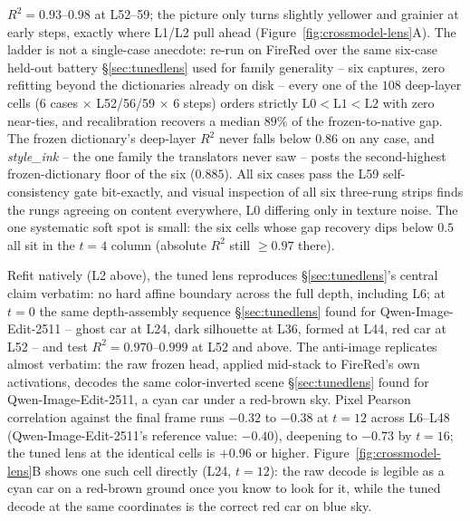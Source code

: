\documentclass[10pt,twocolumn]{article}
\newcommand{\model}{Qwen-Image-Edit-2511}
\begin{document}
$R^2 = 0.93$--$0.98$ at L52--59; the picture only turns slightly
yellower and grainier at early steps, exactly where L1/L2 pull ahead
(Figure~\ref{fig:crossmodel-lens}A). The ladder is not a single-case
anecdote: re-run on FireRed over the same six-case held-out battery
\S\ref{sec:tunedlens} used for family generality -- six captures,
zero refitting beyond the dictionaries already on disk -- every one
of the $108$ deep-layer cells ($6$ cases $\times$ L52/56/59
$\times$ $6$ steps) orders strictly
$\text{L0}<\text{L1}<\text{L2}$ with zero near-ties, and recalibration
recovers a median $89\%$ of the frozen-to-native gap. The frozen
dictionary's deep-layer $R^2$ never falls below $0.86$ on any case,
and \emph{style\_ink} -- the one family the translators never saw --
posts the second-highest frozen-dictionary floor of the six
($0.885$). All six cases pass the L59 self-consistency gate
bit-exactly, and visual inspection of all six three-rung strips
finds the rungs agreeing on content everywhere, L0 differing only in
texture noise. The one systematic soft spot is small: the six cells
whose gap recovery dips below $0.5$ all sit in the $t{=}4$ column
(absolute $R^2$ still ${\ge}0.97$ there).

Refit natively (L2 above), the tuned lens reproduces
\S\ref{sec:tunedlens}'s central claim verbatim: no hard affine
boundary across the full depth, including L6; at $t{=}0$ the same
depth-assembly sequence \S\ref{sec:tunedlens} found for \model{} --
ghost car at L24, dark silhouette at L36, formed at L44, red car at
L52 -- and test $R^2 = 0.970$--$0.999$ at L52 and above. The anti-image
replicates almost verbatim: the raw frozen head, applied mid-stack to
FireRed's own activations, decodes the same color-inverted scene
\S\ref{sec:tunedlens} found for \model{}, a cyan car under a
red-brown sky. Pixel Pearson correlation against the final frame runs
$-0.32$ to $-0.38$ at $t{=}12$ across L6--L48 (\model{}'s reference
value: $-0.40$), deepening to $-0.73$ by $t{=}16$; the tuned lens at
the identical cells is $+0.96$ or higher.
Figure~\ref{fig:crossmodel-lens}B shows one such cell directly (L24,
$t{=}12$): the raw decode is legible as a cyan car on a red-brown
ground once you know to look for it, while the tuned decode at the
same coordinates is the correct red car on blue sky.
\end{document}
